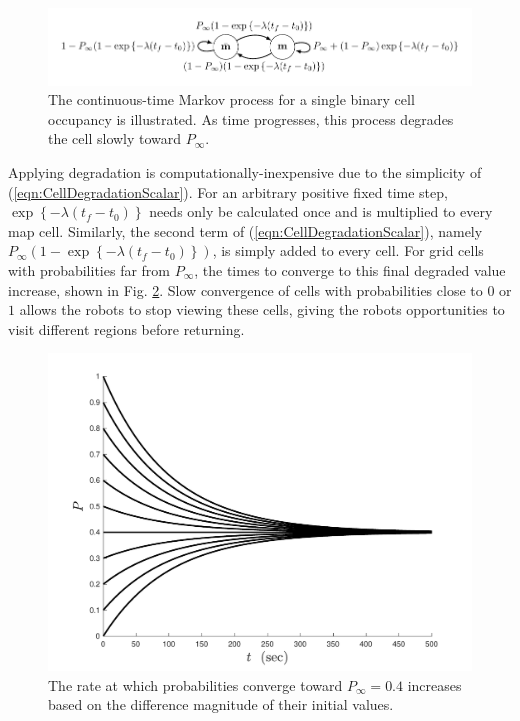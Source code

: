 \documentclass[smallextended]{svjour3}       %
\newcommand{\braces}[1]{\ensuremath{\left\{ #1 \right\}}}
\newcommand{\refeqn}[1]{(\ref{eqn:#1})}
\begin{document}
\begin{figure}
\centering
\includegraphics[width=\textwidth]{markov_diagram_continuous.pdf}
\caption{The continuous-time Markov process for a single binary cell occupancy is illustrated. As time progresses, this process degrades the cell slowly toward $P_\infty.$}
\label{fig:MarkovDegradeContinuous}
\end{figure}

Applying degradation is computationally-inexpensive due to the simplicity of \refeqn{CellDegradationScalar}. For an arbitrary positive fixed time step, $\exp\braces{-\lambda (t_f-t_0)}$ needs only be calculated once and is multiplied to every map cell. Similarly, the second term of \refeqn{CellDegradationScalar}, namely $P_\infty(1-\exp\braces{-\lambda (t_f-t_0)})$, is simply added to every cell. For grid cells with probabilities far from $P_\infty$, the times to converge to this final degraded value increase, shown in Fig. \ref{fig:DegradeExamples}. Slow convergence of cells with probabilities close to $0$ or $1$ allows the robots to stop viewing these cells, giving the robots opportunities to visit different regions before returning.

\begin{figure}
\centering
\includegraphics[width=\textwidth]{DegradeExamples.pdf}
\caption{The rate at which probabilities converge toward $P_\infty=0.4$ increases based on the difference magnitude of their initial values.}
\label{fig:DegradeExamples}
\end{figure}
\end{document}
